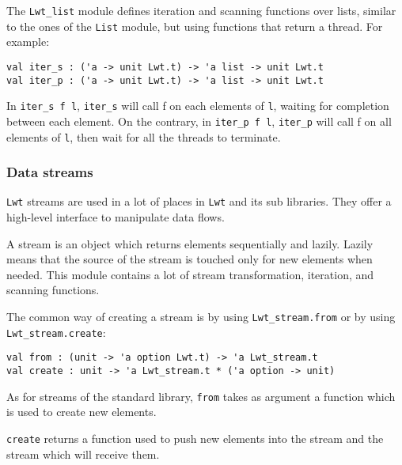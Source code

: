 The {\tt Lwt\_list} module defines iteration and scanning functions
over lists, similar to the ones of the {\tt List} module, but using
functions that return a thread. For example:



\lstset{language=[Objective]Caml}\begin{lstlisting}
val iter_s : ('a -> unit Lwt.t) -> 'a list -> unit Lwt.t
val iter_p : ('a -> unit Lwt.t) -> 'a list -> unit Lwt.t
\end{lstlisting}
\medskip

\noindent
In {\tt iter\_s f l}, {\tt iter\_s} will call f on each elements
of {\tt l}, waiting for completion between each element. On the
contrary, in {\tt iter\_p f l}, {\tt iter\_p} will call f on all
elements of {\tt l}, then wait for all the threads to terminate.



\subsubsection{ Data streams }

{\tt Lwt} streams are used in a lot of places in {\tt Lwt} and its sub
libraries. They offer a high-level interface to manipulate data flows.



A stream is an object which returns elements sequentially and
lazily. Lazily means that the source of the stream is touched only for new
elements when needed. This module contains a lot of stream
transformation, iteration, and scanning functions.



The common way of creating a stream is by using
{\tt Lwt\_stream.from} or by using {\tt Lwt\_stream.create}:



\lstset{language=[Objective]Caml}\begin{lstlisting}
val from : (unit -> 'a option Lwt.t) -> 'a Lwt_stream.t
val create : unit -> 'a Lwt_stream.t * ('a option -> unit)
\end{lstlisting}
\medskip

\noindent
As for streams of the standard library, {\tt from} takes as
argument a function which is used to create new elements.



{\tt create} returns a function used to push new elements
into the stream and the stream which will receive them.



